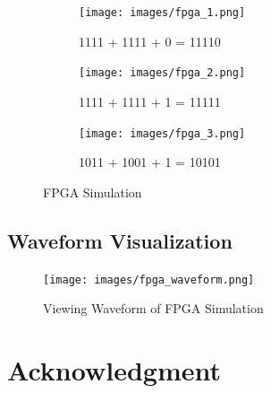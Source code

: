 \documentclass[conference]{IEEEtran}
\begin{document}
\begin{figure}[H]
    \centering
    \begin{subfigure}{0.48\textwidth}
        \texttt{[image: images/fpga\_1.png]}
        \caption{1111 + 1111 + 0 = 11110}
    \end{subfigure}
    \hfill
    \begin{subfigure}{0.48\textwidth}
        \texttt{[image: images/fpga\_2.png]}
        \caption{1111 + 1111 + 1 = 11111}
    \end{subfigure}
    \hfill
    \begin{subfigure}{0.48\textwidth}
        \texttt{[image: images/fpga\_3.png]}
        \caption{1011 + 1001 + 1 = 10101}
    \end{subfigure}
    
    \caption{FPGA Simulation}
    \label{fig:main}
\end{figure}

\subsection{Waveform Visualization}

\begin{figure}[H]
    \centering
    \texttt{[image: images/fpga\_waveform.png]}
    \caption{Viewing Waveform of FPGA Simulation}
\end{figure}

\section*{Acknowledgment}


\begin{thebibliography}{00}
\end{thebibliography}
\end{document}

